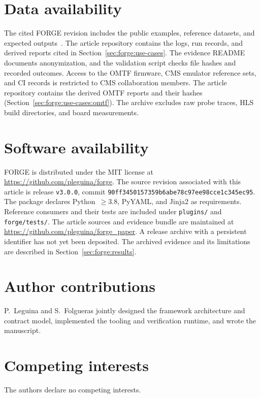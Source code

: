\documentclass[10pt,a4paper]{article}
\newcommand{\forge}{FORGE}
\begin{document}
\section*{Data availability}
The cited \forge{} revision includes the public examples, reference datasets, and expected outputs~\cite{FORGE_Software}. The article repository contains the logs, run records, and derived reports cited in Section~\ref{sec:forge:use-cases}. The evidence README documents anonymization, and the validation script checks file hashes and recorded outcomes. Access to the OMTF firmware, CMS emulator reference sets, and CI records is restricted to CMS collaboration members. The article repository contains the derived OMTF reports and their hashes (Section~\ref{sec:forge:use-cases:omtf}). The archive excludes raw probe traces, HLS build directories, and board measurements.

\section*{Software availability}
\label{sec:forge:software-availability}

\forge{} is distributed under the MIT license at
\url{https://github.com/pleguina/forge}. The source revision associated with this article is
release \texttt{v3.0.0}, commit \texttt{90ff3450157359b6abe78c97ee98cce1c345ec95}.
The package declares Python~$\geq3.8$, PyYAML, and Jinja2 as requirements.
Reference consumers and their tests are included under \texttt{plugins/} and
\texttt{forge/tests/}. The article sources and evidence bundle are maintained at
\url{https://github.com/pleguina/forge_paper}. A release archive with a persistent
identifier has not yet been deposited. The archived evidence and its limitations
are described in Section~\ref{sec:forge:results}.

\section*{Author contributions}
P.\ Leguina and S.\ Folgueras jointly designed the framework architecture and
contract model, implemented the tooling and verification runtime, and wrote the
manuscript.

\section*{Competing interests}
The authors declare no competing interests.
\end{document}
